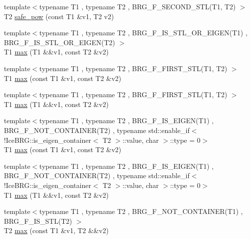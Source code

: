 \begin{DoxyCompactItemize}
\item 
{\footnotesize template$<$typename T1 , typename T2 , B\-R\-G\-\_\-\-F\-\_\-\-S\-E\-C\-O\-N\-D\-\_\-\-S\-T\-L(\-T1, T2) $>$ }\\T2 \hyperlink{namespaceIceBRG_a2ce745aa5aae2b2eb0b9c11401b18e53}{safe\-\_\-pow} (const T1 \&v1, T2 v2)
\item 
{\footnotesize template$<$typename T1 , typename T2 , B\-R\-G\-\_\-\-F\-\_\-\-I\-S\-\_\-\-S\-T\-L\-\_\-\-O\-R\-\_\-\-E\-I\-G\-E\-N(\-T1) , B\-R\-G\-\_\-\-F\-\_\-\-I\-S\-\_\-\-S\-T\-L\-\_\-\-O\-R\-\_\-\-E\-I\-G\-E\-N(\-T2) $>$ }\\T1 \hyperlink{namespaceIceBRG_a49fc08c69c7c1410646ae71b65e8d7d9}{max} (T1 \&\&v1, const T2 \&v2)
\item 
{\footnotesize template$<$typename T1 , typename T2 , B\-R\-G\-\_\-\-F\-\_\-\-F\-I\-R\-S\-T\-\_\-\-S\-T\-L(\-T1, T2) $>$ }\\T1 \hyperlink{namespaceIceBRG_a3f712c88cb13dee58c517feadd58d56f}{max} (const T1 \&v1, const T2 \&v2)
\item 
{\footnotesize template$<$typename T1 , typename T2 , B\-R\-G\-\_\-\-F\-\_\-\-F\-I\-R\-S\-T\-\_\-\-S\-T\-L(\-T1, T2) $>$ }\\T1 \hyperlink{namespaceIceBRG_aa7c1dd695b32d75f8960eb79b6bf3f47}{max} (T1 \&\&v1, const T2 \&v2)
\item 
{\footnotesize template$<$typename T1 , typename T2 , B\-R\-G\-\_\-\-F\-\_\-\-I\-S\-\_\-\-E\-I\-G\-E\-N(\-T1) , B\-R\-G\-\_\-\-F\-\_\-\-N\-O\-T\-\_\-\-C\-O\-N\-T\-A\-I\-N\-E\-R(\-T2) , typename std\-::enable\-\_\-if$<$!\-Ice\-B\-R\-G\-::is\-\_\-eigen\-\_\-container$<$ T2 $>$\-::value, char $>$\-::type  = 0$>$ }\\T1 \hyperlink{namespaceIceBRG_a7b06eec2559936490f7664b4e7fd0b1b}{max} (const T1 \&v1, const T2 \&v2)
\item 
{\footnotesize template$<$typename T1 , typename T2 , B\-R\-G\-\_\-\-F\-\_\-\-I\-S\-\_\-\-E\-I\-G\-E\-N(\-T1) , B\-R\-G\-\_\-\-F\-\_\-\-N\-O\-T\-\_\-\-C\-O\-N\-T\-A\-I\-N\-E\-R(\-T2) , typename std\-::enable\-\_\-if$<$!\-Ice\-B\-R\-G\-::is\-\_\-eigen\-\_\-container$<$ T2 $>$\-::value, char $>$\-::type  = 0$>$ }\\T1 \hyperlink{namespaceIceBRG_a68c20de7810cc8fe09874eea809d58e8}{max} (T1 \&\&v1, const T2 \&v2)
\item 
{\footnotesize template$<$typename T1 , typename T2 , B\-R\-G\-\_\-\-F\-\_\-\-N\-O\-T\-\_\-\-C\-O\-N\-T\-A\-I\-N\-E\-R(\-T1) , B\-R\-G\-\_\-\-F\-\_\-\-I\-S\-\_\-\-S\-T\-L(\-T2) $>$ }\\T2 \hyperlink{namespaceIceBRG_a064fa851b24be3a0f16df5fd7e778307}{max} (const T1 \&v1, T2 \&\&v2)

\end{DoxyCompactItemize}
